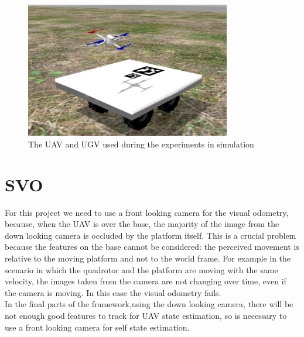 \begin{figure}[!ht]
    \centering
    \includegraphics[width=0.8\textwidth]{img/simulation.jpg}
    \caption{The UAV and UGV used during the experiments in simulation}
    \label{fig:quad_ugv_sim}
\end{figure}

\section{SVO}
For this project we need to use a front looking camera for the visual odometry, because, when the UAV is over the base, the majority of the image from the down looking camera is occluded by the platform itself.
This is a crucial problem because the features on the base cannot be considered: the perceived movement is relative to the moving platform and not to the world frame. For example in the scenario in which the quadrotor and the platform are moving with the same velocity, the images taken from the camera are not changing over time, even if the camera is moving. In this case the visual odometry fails.\\
In the final parts of the framework,using the down looking camera, there will be not enough good features to track  for UAV state estimation, so is necessary to use a front looking camera for self state estimation.

